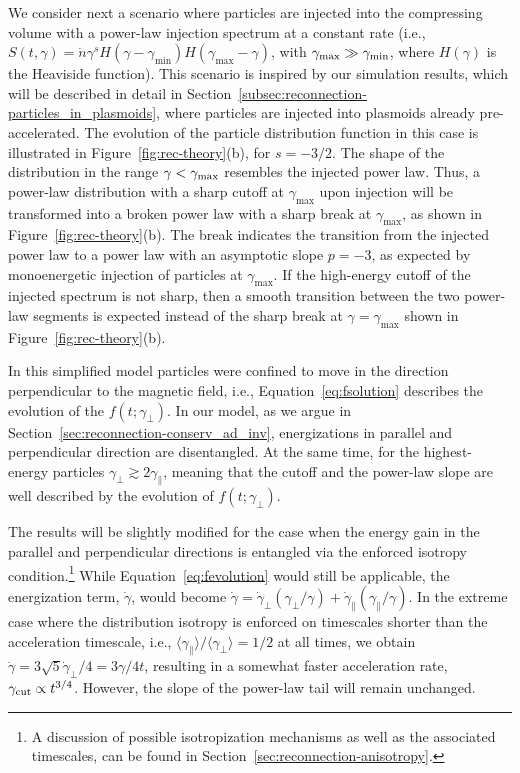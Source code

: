 
We consider next a scenario where particles are injected into the compressing volume with a power-law injection spectrum at a constant rate (i.e., $S(t, \gamma)=\dot{n}\gamma^{s} H(\gamma - \gamma_{\min})H(\gamma_{\max}-\gamma)$, with $\gamma_{\rm max}\gg \gamma_{\rm min}$, where $H(\gamma)$ is the Heaviside function). This scenario is inspired by our simulation results, which will be described in detail in Section~\ref{subsec:reconnection-particles_in_plasmoids}, where particles are injected into plasmoids already pre-accelerated. The evolution of the particle distribution function in this case is illustrated in Figure~\ref{fig:rec-theory}(b), for $s=-3/2$. The shape of the distribution in the range $\gamma < \gamma_{\rm max}$ resembles the injected power law. Thus, a power-law distribution with a sharp cutoff at $\gamma_{\max}$ upon injection will be transformed into a broken power law with a sharp break at $\gamma_{\max}$, as shown in Figure~\ref{fig:rec-theory}(b). The break indicates the transition from the injected power law to a power law with an asymptotic slope $p=-3$, as expected by monoenergetic injection of particles at $\gamma_{\max}$. If the high-energy cutoff of the injected spectrum is not sharp, then a smooth transition between the two power-law segments is expected instead of the sharp break at $\gamma=\gamma_{\max}$ shown in Figure~\ref{fig:rec-theory}(b).

In this simplified model particles were confined to move in the direction perpendicular to the magnetic field, i.e., Equation~\eqref{eq:fsolution} describes the evolution of the $f(t;\gamma_{\perp})$. In our model, as we argue in Section~\ref{sec:reconnection-conserv_ad_inv}, energizations in parallel and perpendicular direction are disentangled. At the same time, for the highest-energy particles $\gamma_{\perp} \gtrsim 2\gamma_\parallel$, meaning that the cutoff and the power-law slope are well described by the evolution of $f(t;\gamma_{\perp})$.

The results will be slightly modified for the case when the energy gain in the parallel and perpendicular directions is entangled via the enforced isotropy condition.\footnote{A discussion of possible isotropization mechanisms as well as the associated timescales, can be found in Section~\ref{sec:reconnection-anisotropy}.} While Equation~\eqref{eq:fevolution} would still be applicable, the energization term, $\dot{\gamma}$, would become $\dot{\gamma} = \dot{\gamma}_{\perp} (\gamma_\perp/\gamma)+\dot{\gamma}_{\parallel} (\gamma_\parallel/\gamma)$. In the extreme case where the distribution isotropy is enforced on timescales shorter than the acceleration timescale, i.e., $\langle\gamma_\parallel\rangle/\langle\gamma_\perp\rangle=1/2$ at all times, we obtain $\dot {\gamma} = 3\sqrt{5}\dot{\gamma}_\perp/4 = 3\gamma / 4 t$, resulting in a somewhat faster acceleration rate, $\gamma_{\rm cut}\propto t^{3/4}$. However, the slope of the power-law tail will remain unchanged. 

